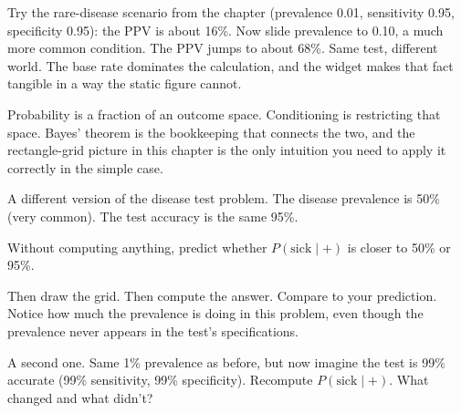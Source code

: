 \documentclass[
  letterpaper,
  11pt,
  twoside,
  openany]{scrbook}
\begin{document}
Try the rare-disease scenario from the chapter (prevalence 0.01,
sensitivity 0.95, specificity 0.95): the PPV is about 16\%. Now slide
prevalence to 0.10, a much more common condition. The PPV jumps to about
68\%. Same test, different world. The base rate dominates the
calculation, and the widget makes that fact tangible in a way the static
figure cannot.

\begin{tcolorbox}[enhanced jigsaw, arc=.35mm, bottomrule=.15mm, bottomtitle=1mm, breakable, colback=white, colbacktitle=quarto-callout-warning-color!10!white, colframe=quarto-callout-warning-color-frame, coltitle=black, left=2mm, leftrule=.75mm, opacityback=0, opacitybacktitle=0.6, rightrule=.15mm, title=\textcolor{quarto-callout-warning-color}{\faExclamationTriangle}\hspace{0.5em}{Key insight}, titlerule=0mm, toprule=.15mm, toptitle=1mm]

Probability is a fraction of an outcome space. Conditioning is
restricting that space. Bayes' theorem is the bookkeeping that connects
the two, and the rectangle-grid picture in this chapter is the only
intuition you need to apply it correctly in the simple case.

\end{tcolorbox}

\begin{tcolorbox}[enhanced jigsaw, arc=.35mm, bottomrule=.15mm, bottomtitle=1mm, breakable, colback=white, colbacktitle=quarto-callout-tip-color!10!white, colframe=quarto-callout-tip-color-frame, coltitle=black, left=2mm, leftrule=.75mm, opacityback=0, opacitybacktitle=0.6, rightrule=.15mm, title=\textcolor{quarto-callout-tip-color}{\faLightbulb}\hspace{0.5em}{Try this}, titlerule=0mm, toprule=.15mm, toptitle=1mm]

A different version of the disease test problem. The disease prevalence
is 50\% (very common). The test accuracy is the same 95\%.

Without computing anything, predict whether \(P(\text{sick} \mid +)\) is
closer to 50\% or 95\%.

Then draw the grid. Then compute the answer. Compare to your prediction.
Notice how much the prevalence is doing in this problem, even though the
prevalence never appears in the test's specifications.

A second one. Same 1\% prevalence as before, but now imagine the test is
99\% accurate (99\% sensitivity, 99\% specificity). Recompute
\(P(\text{sick} \mid +)\). What changed and what didn't?

\end{tcolorbox}
\end{document}
